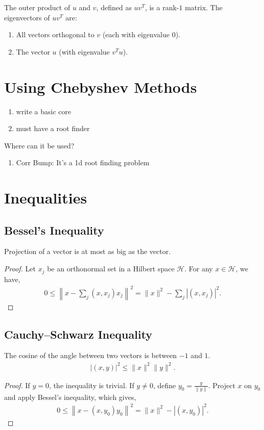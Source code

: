 \documentclass{amsart}
\theoremstyle{plain}
\numberwithin{equation}{section}
\begin{document}
The outer product of $u$ and $v$, defined as $uv^T$, is a rank-$1$  matrix.
The eigenvectors of $uv^T$ are:
\begin{enumerate}
\item All vectors orthogonal to $v$ (each with eigenvalue $0$).
\item The vector $u$ (with eigenvalue $v^Tu$).
\end{enumerate}


\section{Using Chebyshev Methods}
\begin{enumerate}
\item write a basic core
\item must have a root finder
\end{enumerate}

Where can it be used?
\begin{enumerate}
\item Corr Bump: It's a 1d root finding problem
\end{enumerate}

\section*{Inequalities}
\subsection*{Bessel's Inequality}
Projection of a vector is at most as big 
as the vector. 
\begin{proof}
Let ${x_j}$ be an orthonormal set in a Hilbert space $\mathcal{H}$.
For any $x \in \mathcal{H}$, we have, 
\begin{align*}
0 \leq \left\|x - \sum_{j}(x, x_j) x_j\right\|^2 = 
\|x\|^2 - \sum_{j}|(x, x_j)|^2.
\end{align*}
\end{proof}

\subsection*{Cauchy--Schwarz Inequality}
The cosine of the angle between two vectors is 
between $-1$ and $1$. 
\begin{align*}
|(x, y)|^2 \leq \|x\|^2 \|y\|^2.
\end{align*}

\begin{proof}
If $y=0$, the inequality is trivial. If $y\neq 0$, define
$y_0 = \frac{y}{\|y\|}$. Project $x$ on $y_0$ and apply
Bessel's inequality, which gives,
\begin{align*}
0 \leq \left\|x - (x, y_0) y_0\right\|^2 = 
\|x\|^2 - |(x, y_0)|^2.
\end{align*}
\end{proof}
\end{document}
